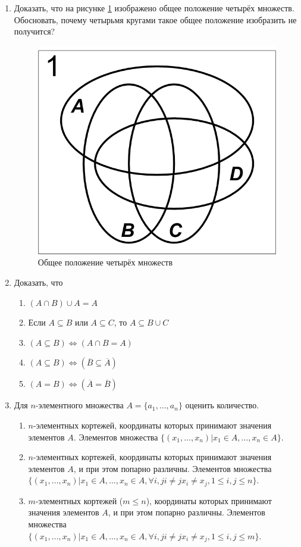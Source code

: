 \begin{enumerate}
    \item Доказать, что на рисунке \ref{fig:sets:commonABCDset} изображено общее положение четырёх множеств. Обосновать, почему четырьмя кругами такое общее положение изобразить не получится?
    \begin{figure}[!ht]
        \centering
        \includegraphics[width=.3\textwidth]{fig/commonABCDset}
        \caption{Общее положение четырёх множеств}
        \label{fig:sets:commonABCDset}
    \end{figure} 
    
    \item Доказать, что 
    \begin{enumerate}
        \item $(A\cap B)\cup A=A$
        \item Если $A\subseteq B$ или $A\subseteq C$, то $A\subseteq B\cup C$
        \item $(A\subseteq B)\Leftrightarrow (A\cap B=A)$
        \item $(A\subseteq B)\Leftrightarrow (\overline{B}\subseteq\overline{A})$
        \item $(A=B)\Leftrightarrow (\overline{A}=\overline{B})$
    \end{enumerate}
    
    \item Для $n$-элементного множества $A=\{a_1,\ldots,a_n\}$ оценить количество.
    \begin{enumerate}
        \item $n$-элементных кортежей, координаты которых принимают значения элементов $A$. Элементов множества $\{(x_1,\ldots,x_n)|x_1\in A,\ldots,x_n\in A\}$.
        
        \item $n$-элементных кортежей, координаты которых принимают значения элементов $A$, и при этом попарно различны. Элементов множества $\{(x_1,\ldots,x_n)|x_1\in A,\ldots,x_n\in A,\forall i,j i\neq j x_i\neq x_j, 1\leq i,j\leq n\}$.
        
        \item $m$-элементных кортежей ($m\leq n$), координаты которых принимают значения элементов $A$, и при этом попарно различны. Элементов множества $\{(x_1,\ldots,x_n)|x_1\in A,\ldots,x_n\in A,\forall i,j i\neq j x_i\neq x_j, 1\leq i,j\leq m\}$.
        

\end{enumerate}
\end{enumerate}
